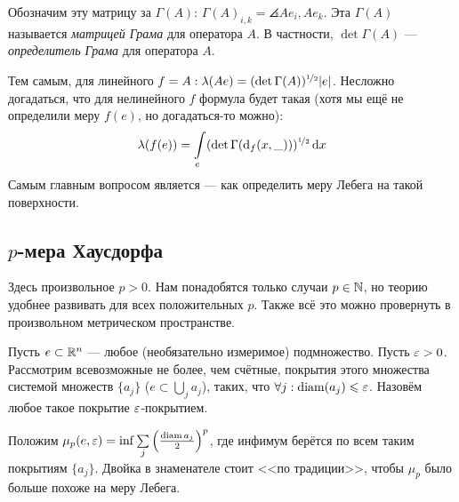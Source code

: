 \documentclass[a4paper]{report}
\begin{document}
    Обозначим эту матрицу за $\Gamma(A)$: $\Gamma(A)_{i,k} = \angles{A e_i, A e_k}$.
    Эта $\Gamma(A)$ называется \emph{матрицей Грама} для оператора $A$.
    В частности, $\det\Gamma(A)$ --- \emph{определитель Грама} для оператора $A$.

    Тем самым, для линейного $f = A: \lambda(Ae) = (\det \Gamma(A))^{\nicefrac12}|e|$.
    Несложно догадаться, что для нелинейного $f$ формула будет такая (хотя мы ещё не определили меру $f(e)$, но догадаться-то можно): \[\lambda(f(e)) = \int\limits_{e}(\det \Gamma(\operatorname{d}\!_f(x, \_)))^{\nicefrac12}\operatorname{d}\! x\]
    Самым главным вопросом является --- как определить меру Лебега на такой поверхности.
    \subsection{$p$-мера Хаусдорфа}
    Здесь произвольное $p > 0$.
    Нам понадобятся только случаи $p \in \mathbb{N}$, но теорию удобнее развивать для всех положительных $p$.
    Также всё это можно провернуть в произвольном метрическом пространстве.

    Пусть $e \subset \mathbb{R}^n$ --- любое (необязательно измеримое) подмножество.
    Пусть $\varepsilon > 0$.
    Рассмотрим всевозможные не более, чем счётные, покрытия этого множества системой множеств $\{a_j\}$ ($e \subset \bigcup\limits_{j}a_j$), таких, что $\forall j: \operatorname{diam}(a_j) \leqslant \varepsilon$.
    Назовём любое такое покрытие $\varepsilon$-покрытием.

    Положим $\mu_p(e, \varepsilon) = \inf\sum\limits_{j}\left(\frac{\operatorname{diam} a_j}2\right)^p$, где инфимум берётся по всем таким покрытиям $\{a_j\}$.
    Двойка в знаменателе стоит <<по традиции>>, чтобы $\mu_p$ было больше похоже на меру Лебега.
\end{document}
